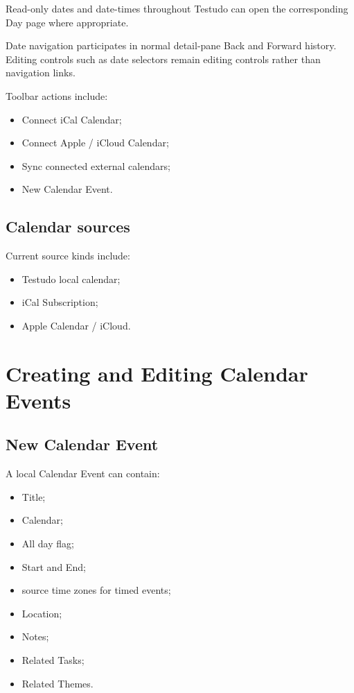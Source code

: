 \documentclass{testudomanual}
\begin{document}
Read-only dates and date-times throughout Testudo can open the corresponding Day page where appropriate.

Date navigation participates in normal detail-pane Back and Forward history. Editing controls such as date selectors remain editing controls rather than navigation links.


Toolbar actions include:
\begin{itemize}
    \item Connect iCal Calendar;
    \item Connect Apple / iCloud Calendar;
    \item Sync connected external calendars;
    \item New Calendar Event.
\end{itemize}

\section{Calendar sources}

Current source kinds include:
\begin{itemize}
    \item Testudo local calendar;
    \item iCal Subscription;
    \item Apple Calendar / iCloud.
\end{itemize}


\chapter{Creating and Editing Calendar Events}

\section{New Calendar Event}

A local Calendar Event can contain:
\begin{itemize}
    \item Title;
    \item Calendar;
    \item All day flag;
    \item Start and End;
    \item source time zones for timed events;
    \item Location;
    \item Notes;
    \item Related Tasks;
    \item Related Themes.
\end{itemize}
\end{document}
